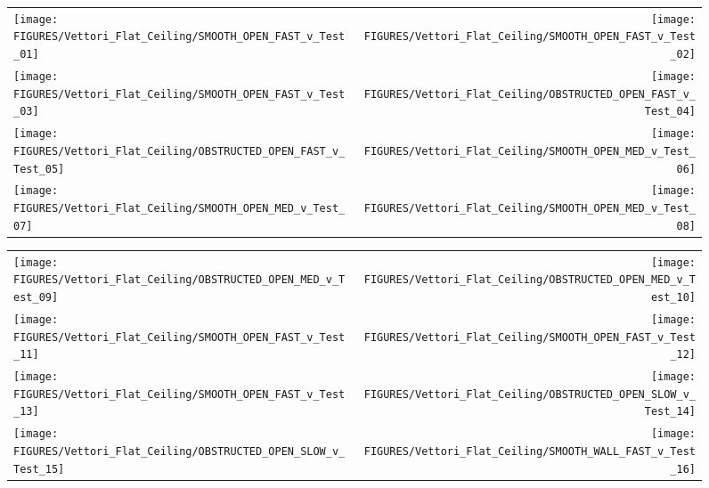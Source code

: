 \begin{figure}[p]
\begin{tabular*}{\textwidth}{l@{\extracolsep{\fill}}r}
\texttt{[image: FIGURES/Vettori\_Flat\_Ceiling/SMOOTH\_OPEN\_FAST\_v\_Test\_01]} &
\texttt{[image: FIGURES/Vettori\_Flat\_Ceiling/SMOOTH\_OPEN\_FAST\_v\_Test\_02]} \\
\texttt{[image: FIGURES/Vettori\_Flat\_Ceiling/SMOOTH\_OPEN\_FAST\_v\_Test\_03]} &
\texttt{[image: FIGURES/Vettori\_Flat\_Ceiling/OBSTRUCTED\_OPEN\_FAST\_v\_Test\_04]} \\
\texttt{[image: FIGURES/Vettori\_Flat\_Ceiling/OBSTRUCTED\_OPEN\_FAST\_v\_Test\_05]} &
\texttt{[image: FIGURES/Vettori\_Flat\_Ceiling/SMOOTH\_OPEN\_MED\_v\_Test\_06]} \\
\texttt{[image: FIGURES/Vettori\_Flat\_Ceiling/SMOOTH\_OPEN\_MED\_v\_Test\_07]} &
\texttt{[image: FIGURES/Vettori\_Flat\_Ceiling/SMOOTH\_OPEN\_MED\_v\_Test\_08]} \\
\end{tabular*}
\label{Vettori_1}
\end{figure}

\begin{figure}[p]
\begin{tabular*}{\textwidth}{l@{\extracolsep{\fill}}r}
\texttt{[image: FIGURES/Vettori\_Flat\_Ceiling/OBSTRUCTED\_OPEN\_MED\_v\_Test\_09]} &
\texttt{[image: FIGURES/Vettori\_Flat\_Ceiling/OBSTRUCTED\_OPEN\_MED\_v\_Test\_10]} \\
\texttt{[image: FIGURES/Vettori\_Flat\_Ceiling/SMOOTH\_OPEN\_FAST\_v\_Test\_11]} &
\texttt{[image: FIGURES/Vettori\_Flat\_Ceiling/SMOOTH\_OPEN\_FAST\_v\_Test\_12]} \\
\texttt{[image: FIGURES/Vettori\_Flat\_Ceiling/SMOOTH\_OPEN\_FAST\_v\_Test\_13]} &
\texttt{[image: FIGURES/Vettori\_Flat\_Ceiling/OBSTRUCTED\_OPEN\_SLOW\_v\_Test\_14]} \\
\texttt{[image: FIGURES/Vettori\_Flat\_Ceiling/OBSTRUCTED\_OPEN\_SLOW\_v\_Test\_15]} &
\texttt{[image: FIGURES/Vettori\_Flat\_Ceiling/SMOOTH\_WALL\_FAST\_v\_Test\_16]} \\
\end{tabular*}
\label{Vettori_2}
\end{figure}

